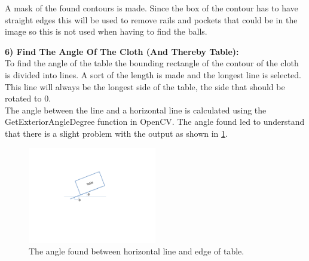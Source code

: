 A mask of the found contours is made. Since the box of the contour has to have straight edges this will be used to remove rails and pockets that could be in the image so this is not used when having to find the balls.

\begin{figure}[H]
\centering
{}
\end{figure}

\textbf{6) Find The Angle Of The Cloth (And Thereby Table):}\\
To find the angle of the table the bounding rectangle of the contour of the cloth is divided into lines. A sort of the length is made and the longest line is selected. This line will always be the longest side of the table, the side that should be rotated to 0\degree. \\

The angle between the line and a horizontal line is calculated using the GetExteriorAngleDegree function in OpenCV\cite{opencv}. The angle found led to understand that there is a slight problem with the output as shown in \ref{fig:table_angle}.

\begin{figure}[H]
\begin{center}
\leavevmode
\includegraphics[width=0.5\textwidth]{images/table_angle}
\end{center}
\caption{The angle found between horizontal line and edge of table.}
\label{fig:table_angle}
\end{figure}

